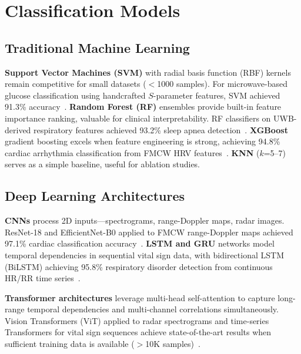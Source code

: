 \documentclass[journal,twoside]{IEEEtran}
\begin{document}
\section{Classification Models}

\subsection{Traditional Machine Learning}

\textbf{Support Vector Machines (SVM)} with radial basis function (RBF) kernels remain competitive for small datasets ($<$1000 samples). For microwave-based glucose classification using handcrafted $S$-parameter features, SVM achieved 91.3\% accuracy~\cite{ref_noninvasive_glucose2025}. \textbf{Random Forest (RF)} ensembles provide built-in feature importance ranking, valuable for clinical interpretability. RF classifiers on UWB-derived respiratory features achieved 93.2\% sleep apnea detection~\cite{ref_uwb_overview2024}. \textbf{XGBoost} gradient boosting excels when feature engineering is strong, achieving 94.8\% cardiac arrhythmia classification from FMCW HRV features~\cite{ref_mmwave_arrhythmia2023}. \textbf{KNN} ($k$=5--7) serves as a simple baseline, useful for ablation studies.

\subsection{Deep Learning Architectures}

\textbf{CNNs} process 2D inputs---spectrograms, range-Doppler maps, radar images. ResNet-18 and EfficientNet-B0 applied to FMCW range-Doppler maps achieved 97.1\% cardiac classification accuracy~\cite{ref_comprehensive_dataset2024}. \textbf{LSTM and GRU} networks model temporal dependencies in sequential vital sign data, with bidirectional LSTM (BiLSTM) achieving 95.8\% respiratory disorder detection from continuous HR/RR time series~\cite{ref_wearable_cardio2025}.

\textbf{Transformer architectures} leverage multi-head self-attention to capture long-range temporal dependencies and multi-channel correlations simultaneously. Vision Transformers (ViT) applied to radar spectrograms and time-series Transformers for vital sign sequences achieve state-of-the-art results when sufficient training data is available ($>$10K samples)~\cite{ref_mlrf_sensing2025}.
\end{document}
